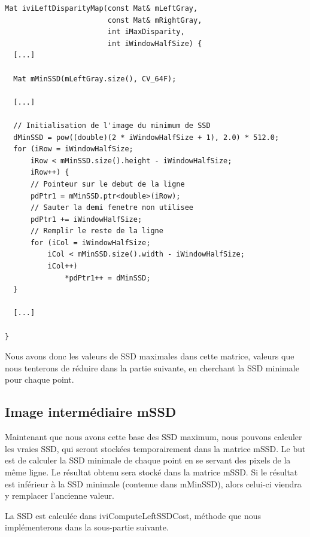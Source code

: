 \documentclass[a4paper]{article}
\begin{document}
\begin{lstlisting}
Mat iviLeftDisparityMap(const Mat& mLeftGray,
                        const Mat& mRightGray,
                        int iMaxDisparity,
                        int iWindowHalfSize) {
  [...]

  Mat mMinSSD(mLeftGray.size(), CV_64F);

  [...]

  // Initialisation de l'image du minimum de SSD
  dMinSSD = pow((double)(2 * iWindowHalfSize + 1), 2.0) * 512.0;
  for (iRow = iWindowHalfSize;
      iRow < mMinSSD.size().height - iWindowHalfSize;
      iRow++) {
      // Pointeur sur le debut de la ligne
      pdPtr1 = mMinSSD.ptr<double>(iRow);
      // Sauter la demi fenetre non utilisee
      pdPtr1 += iWindowHalfSize;
      // Remplir le reste de la ligne
      for (iCol = iWindowHalfSize;
          iCol < mMinSSD.size().width - iWindowHalfSize;
          iCol++)
              *pdPtr1++ = dMinSSD;
  }

  [...]

}
\end{lstlisting}

Nous avons donc les valeurs de SSD maximales dans cette matrice, valeurs que nous tenterons de réduire dans la partie suivante, en cherchant la SSD minimale pour chaque point.

\subsection{Image intermédiaire mSSD}

Maintenant que nous avons cette base des SSD maximum, nous pouvons calculer les vraies SSD, qui seront stockées temporairement dans la matrice mSSD.
Le but est de calculer la SSD minimale de chaque point en se servant des pixels de la même ligne. Le résultat obtenu sera stocké dans la matrice mSSD. Si le résultat est inférieur à la SSD minimale (contenue dans mMinSSD), alors celui-ci viendra y remplacer l'ancienne valeur.

La SSD est calculée dans iviComputeLeftSSDCost, méthode que nous implémenterons dans la sous-partie suivante.
\end{document}
